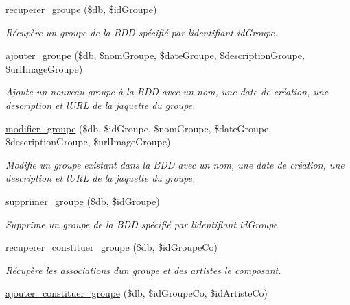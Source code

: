 \begin{DoxyCompactItemize}
\hyperlink{fonctionGroupe_8php_ac6a7a3bba5f040d9bf7cc2f55d7c2939}{recuperer\+\_\+groupe} (\$db, \$id\+Groupe)
\begin{DoxyCompactList}\small\item\em Récupère un groupe de la B\+DD spécifié par l\textquotesingle{}identifiant \textquotesingle{}id\+Groupe\textquotesingle{}. \end{DoxyCompactList}\item 
\hyperlink{fonctionGroupe_8php_a855fe2ca0e13ad41bf47ef11c5320921}{ajouter\+\_\+groupe} (\$db, \$nom\+Groupe, \$date\+Groupe, \$description\+Groupe, \$url\+Image\+Groupe)
\begin{DoxyCompactList}\small\item\em Ajoute un nouveau groupe à la B\+DD avec un nom, une date de création, une description et l\textquotesingle{}U\+RL de la jaquette du groupe. \end{DoxyCompactList}\item 
\hyperlink{fonctionGroupe_8php_a5b114a67f8cd0f498201ba8037192242}{modifier\+\_\+groupe} (\$db, \$id\+Groupe, \$nom\+Groupe, \$date\+Groupe, \$description\+Groupe, \$url\+Image\+Groupe)
\begin{DoxyCompactList}\small\item\em Modifie un groupe existant dans la B\+DD avec un nom, une date de création, une description et l\textquotesingle{}U\+RL de la jaquette du groupe. \end{DoxyCompactList}\item 
\hyperlink{fonctionGroupe_8php_a2cccf196483476d1bb39f93e718f2463}{supprimer\+\_\+groupe} (\$db, \$id\+Groupe)
\begin{DoxyCompactList}\small\item\em Supprime un groupe de la B\+DD spécifié par l\textquotesingle{}identifiant \textquotesingle{}id\+Groupe\textquotesingle{}. \end{DoxyCompactList}\item 
\hyperlink{fonctionGroupe_8php_a34999ffdf7a39cd7077935546386044b}{recuperer\+\_\+constituer\+\_\+groupe} (\$db, \$id\+Groupe\+Co)
\begin{DoxyCompactList}\small\item\em Récupère les associations d\textquotesingle{}un groupe et des artistes le composant. \end{DoxyCompactList}\item 
\hyperlink{fonctionGroupe_8php_a7c4047a36849390ebe535ec018c631b0}{ajouter\+\_\+constituer\+\_\+groupe} (\$db, \$id\+Groupe\+Co, \$id\+Artiste\+Co)

\end{DoxyCompactItemize}
